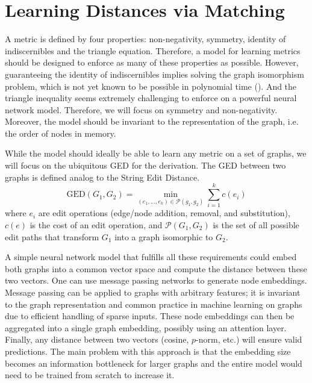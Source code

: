 \section{Learning Distances via Matching}

A metric is defined by four properties: non-negativity, symmetry, identity of indiscernibles and the triangle equation. Therefore, a model for learning metrics should be designed to enforce as many of these properties as possible. However, guaranteeing the identity of indiscernibles implies solving the graph isomorphism problem, which is not yet known to be possible in polynomial time (\citealp{np_complete1998}). And the triangle inequality seems extremely challenging to enforce on a powerful neural network model. Therefore, we will focus on symmetry and non-negativity. Moreover, the model should be invariant to the representation of the graph, i.e. the order of nodes in memory.

While the model should ideally be able to learn any metric on a set of graphs, we will focus on the ubiquitous GED for the derivation. The GED between two graphs is defined analog to the String Edit Distance.
\begin{equation}
     \text{GED}(G_{1},G_{2}) = \min_{(e_{1},...,e_{k}) \in \mathcal{P}(g_{1},g_{2})} \sum_{i=1}^{k} c(e_{i})
\end{equation}
where $e_{i}$ are edit operations (edge/node addition, removal, and substitution), $c(e)$ is the cost of an edit operation, and $\mathcal{P}(G_{1},G_{2})$ is the set of all possible edit paths that transform $G_{1}$ into a graph isomorphic to $G_{2}$.

A simple neural network model that fulfills all these requirements could embed both graphs into a common vector space and compute the distance between these two vectors. One can use message passing networks to generate node embeddings. Message passing can be applied to graphs with arbitrary features; it is invariant to the graph representation and common practice in machine learning on graphs due to efficient handling of sparse inputs. These node embeddings can then be aggregated into a single graph embedding, possibly using an attention layer. Finally, any distance between two vectors (cosine, $p$-norm, etc.) will ensure valid predictions. The main problem with this approach is that the embedding size becomes an information bottleneck for larger graphs and the entire model would need to be trained from scratch to increase it.

